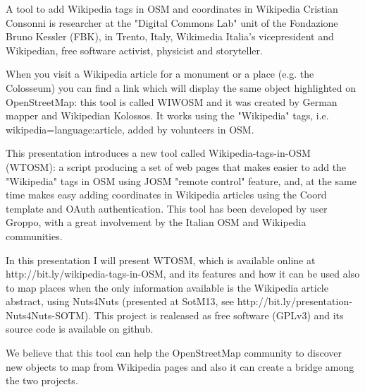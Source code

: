 %
{A tool to add Wikipedia tags in OSM and coordinates in Wikipedia}%
{Cristian Consonni is researcher at the "Digital Commons Lab" unit of the Fondazione Bruno Kessler (FBK), in Trento, Italy, Wikimedia Italia's vicepresident and Wikipedian, free software activist, physicist and storyteller.}%
{When you visit a Wikipedia article for a monument or a place (e.g. the Colosseum) you can find a link which will display the same object highlighted on OpenStreetMap: this tool is called WIWOSM and it was created by German mapper and Wikipedian Kolossos. It works using the "Wikipedia" tags, i.e. wikipedia=language:article, added by volunteers
in OSM.

This presentation introduces a new tool called Wikipedia-tags-in-OSM (WTOSM): a script producing a set of web pages that makes easier to add the "Wikipedia" tags in OSM using JOSM "remote control" feature, and, at the same time makes easy adding coordinates in Wikipedia articles using the {{Coord}} template and OAuth authentication. This tool has been developed by user Groppo, with a great involvement by
the Italian OSM and Wikipedia communities.

In this presentation I will present WTOSM, which is available online at http://bit.ly/wikipedia-tags-in-OSM, and its features and how it
can be used also to map places when the only information available is the Wikipedia article abstract, using Nuts4Nuts (presented at SotM13,
see http://bit.ly/presentation-Nuts4Nuts-SOTM). This project is realeased as free software (GPLv3) and its source code is available on
github.

We believe that this tool can help the OpenStreetMap community to discover new objects to map from Wikipedia pages and also it can
create a bridge among the two projects.}

